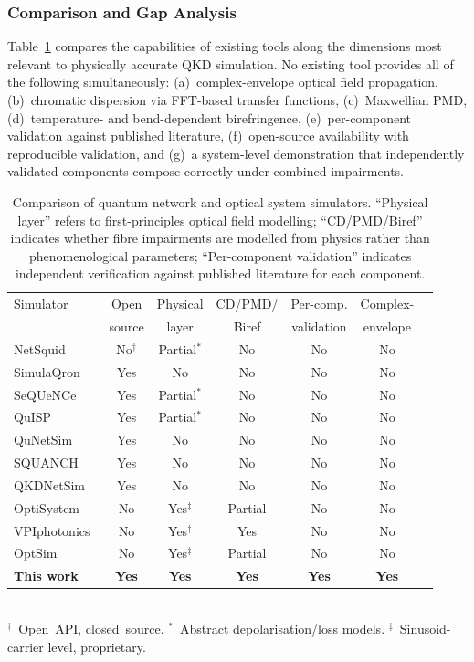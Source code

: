 \documentclass[3p,times,preprint]{elsarticle}
\begin{document}
\subsubsection{Comparison and Gap Analysis}

Table~\ref{tab:comparison} compares the capabilities of existing tools
along the dimensions most relevant to physically accurate QKD simulation.
No existing tool provides all of the following simultaneously:
(a)~complex-envelope optical field propagation,
(b)~chromatic dispersion via FFT-based transfer functions,
(c)~Maxwellian PMD,
(d)~temperature- and bend-dependent birefringence,
(e)~per-component validation against published literature,
(f)~open-source availability with reproducible validation, and
(g)~a system-level demonstration that independently validated components
compose correctly under combined impairments.

\begin{table}[htbp]
  \caption{Comparison of quantum network and optical system simulators.
  ``Physical layer'' refers to first-principles optical field modelling;
  ``CD/PMD/Biref'' indicates whether fibre impairments are modelled
  from physics rather than phenomenological parameters;
  ``Per-component validation'' indicates independent verification
  against published literature for each component.}
  \label{tab:comparison}
  \centering
  \small
  \begin{tabular}{l c c c c c c}
    \toprule
    Simulator & Open & Physical & CD/PMD/ & Per-comp. & Complex- \\
    & source & layer & Biref & validation & envelope \\
    \midrule
    NetSquid~\cite{netSquid}       & No$^\dagger$ & Partial$^*$ & No  & No  & No \\
    SimulaQron~\cite{simulaqron}   & Yes & No  & No  & No  & No \\
    SeQUeNCe~\cite{sequence}       & Yes & Partial$^*$ & No  & No  & No \\
    QuISP~\cite{quisp}             & Yes & Partial$^*$ & No  & No  & No \\
    QuNetSim~\cite{qunetsim}       & Yes & No  & No  & No  & No \\
    SQUANCH~\cite{squanch}         & Yes & No  & No  & No  & No \\
    QKDNetSim~\cite{qkdnetsim}     & Yes & No  & No  & No  & No \\
    OptiSystem~\cite{optisystem}   & No  & Yes$^\ddagger$ & Partial & No & No \\
    VPIphotonics~\cite{vpiphotonics} & No & Yes$^\ddagger$ & Yes & No & No \\
    OptSim~\cite{optsim}           & No  & Yes$^\ddagger$ & Partial & No & No \\
    \textbf{This work}             & \textbf{Yes} & \textbf{Yes} & \textbf{Yes} & \textbf{Yes} & \textbf{Yes} \\
    \bottomrule
  \end{tabular}
  \\[4pt]
  {\footnotesize $^\dagger$~Open~API, closed~source. \quad
  $^*$~Abstract depolarisation/loss models. \quad
  $^\ddagger$~Sinusoid-carrier level, proprietary.}
\end{table}
\end{document}
